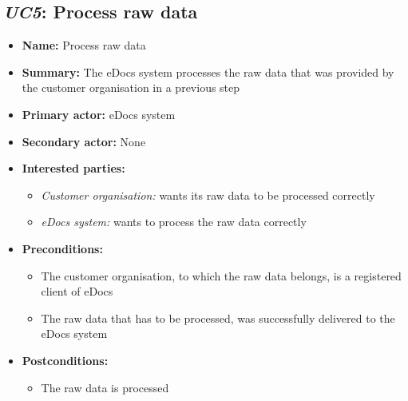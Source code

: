 \documentclass[a4paper,10pt]{article}
\begin{document}
\subsection{\emph{UC5}: Process raw data}
\begin{itemize}
    \item \textbf{Name:} Process raw data
    \item \textbf{Summary:} The eDocs system processes the raw data that was provided by the customer organisation in a previous step
    \item \textbf{Primary actor:} eDocs system
    \item \textbf{Secondary actor:} None
    \item \textbf{Interested parties:} 
        \begin{itemize}
            \item \textit{Customer organisation:} wants its raw data to be processed correctly
            \item \textit{eDocs system:} wants to process the raw data correctly
        \end{itemize}
    \item \textbf{Preconditions:}
        \begin{itemize}
            \item The customer organisation, to which the raw data belongs, is a registered client of eDocs
            \item The raw data that has to be processed, was successfully delivered to the eDocs system
        \end{itemize}
    \item \textbf{Postconditions:}
        \begin{itemize}
            \item The raw data is processed
        \end{itemize}
        

\end{itemize}
\end{document}
